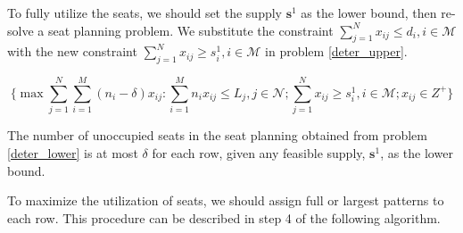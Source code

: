 To fully utilize the seats, we should set the supply $\mathbf{s}^{1}$ as the lower bound, then re-solve a seat planning problem. We substitute the constraint $\sum_{j =1}^{N} x_{ij} \leq d_{i}, i \in \mathcal{M}$ with the new constraint $\sum_{j =1}^{N} x_{ij} \geq s_{i}^{1}, i \in \mathcal{M}$ in problem \eqref{deter_upper}.


\begin{equation}\label{deter_lower}
\{\max \sum_{j=1}^{N} \sum_{i=1}^{M}(n_i -\delta) x_{ij}: \sum_{i = 1}^{M} n_i x_{ij} \leq L_{j}, j \in \mathcal{N}; \sum_{j =1}^{N} x_{ij} \geq s_{i}^{1}, i \in \mathcal{M}; x_{ij} \in Z^{+} \}
\end{equation}

\begin{lem}
  The number of unoccupied seats in the seat planning obtained from problem \eqref{deter_lower} is at most $\delta$ for each row, given any feasible supply, $\mathbf{s}^{1}$, as the lower bound.
\end{lem}

To maximize the utilization of seats, we should assign full or largest patterns to each row. This procedure can be described in step 4 of the following algorithm.








